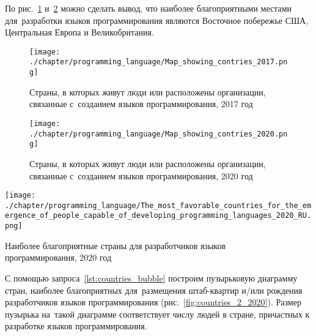 По рис.~\ref{fig:countries_2017} и~\ref{fig:countries_2020} можно сделать вывод, 
что наиболее благоприятными местами для~разработки языков программирования являются 
Восточное побережье США, Центральная Европа и Великобритания.


\begin{figure}[h]
\centering
	\texttt{[image: ./chapter/programming\_language/Map\_showing\_contries\_2017.png]}
	\caption[Страны, в которых живут люди или расположены организации, связанные с созданием языков программирования, 2017 год.]
    {Страны, в которых живут люди или расположены организации, 
     связанные с~созданием языков программирования, 2017 год}
	\label{fig:countries_2017}
\end{figure}
\begin{figure}
\centering
	\texttt{[image: ./chapter/programming\_language/Map\_showing\_contries\_2020.png]}
	\caption[Страны, в которых живут люди или расположены организации, связанные с созданием языков программирования, 2020 год.]
    {Страны, в которых живут люди или расположены организации, 
    связанные с~созданием языков программирования, 2020 год}
	\label{fig:countries_2020}
\end{figure}

\begin{marginfigure}
\texttt{[image: ./chapter/programming\_language/The\_most\_favorable\_countries\_for\_the\_emergence\_of\_people\_capable\_of\_developing\_programming\_languages\_2020\_RU.png]}
  \caption[Наиболее благоприятные страны для разработчиков языков программирования, 2020 год.]
    {Наиболее благоприятные страны для разработчиков языков\\программирования, 2020 год}%
  \label{fig:countries_2_2020}%
\end{marginfigure}



С помощью запроса~\ref{lst:countries_bubble} 
построим пузырьковую диаграмму стран, 
наиболее благоприятных для~размещения штаб-квартир и/или 
рождения разработчиков языков программирования (рис.~\ref{fig:countries_2_2020}). 
Размер пузырька на~такой диаграмме соответствует числу людей в стране, причастных к разработке языков программирования.


